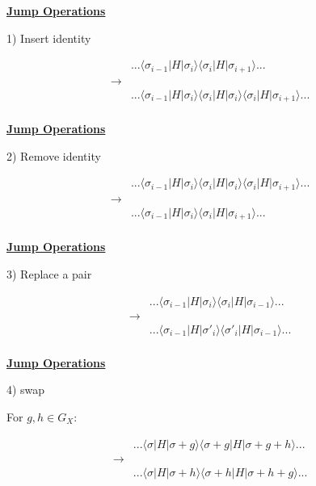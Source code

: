 \documentclass[11pt]{article}
\def\heading #1{\centerline{\underline{\bf\LARGE #1}}}
\def\vsp {\vspace*{0.5cm}}
\def\ket #1{|#1\rangle}
\def\bra #1{\langle #1|}
\begin{document}
\heading{Jump Operations}

\vsp
1) Insert identity

\begin{align*}
&... \bra{\sigma_{i-1}} H \ket{\sigma_i}\bra{\sigma_{i}} H \ket{\sigma_{i+1}}... \\
\longrightarrow &\\
&... \bra{\sigma_{i-1}} H \ket{\sigma_i}
    \bra{\sigma_{i}} H \ket{\sigma_{i}} 
    \bra{\sigma_{i}} H \ket{\sigma_{i+1}}... \\
\end{align*}


\newpage %

\heading{Jump Operations}

\vsp
2) Remove identity

\begin{align*}
&... \bra{\sigma_{i-1}} H \ket{\sigma_i}
    \bra{\sigma_{i}} H \ket{\sigma_{i}} 
    \bra{\sigma_{i}} H \ket{\sigma_{i+1}}... \\
\longrightarrow &\\
&... \bra{\sigma_{i-1}} H \ket{\sigma_i}\bra{\sigma_{i}} H \ket{\sigma_{i+1}}... \\
\end{align*}

\newpage %

\heading{Jump Operations}

\vsp
3) Replace a pair

\begin{align*}
&... \bra{\sigma_{i-1}} H \ket{\sigma_i}
    \bra{\sigma_{i}} H \ket{\sigma_{i-1}} ...\\
\longrightarrow &\\
&... \bra{\sigma_{i-1}} H \ket{\sigma'_i}
    \bra{\sigma'_{i}} H \ket{\sigma_{i-1}} ...\\
\end{align*}


\newpage %

\heading{Jump Operations}

\vsp
4) swap

\vsp
For $g, h \in G_X:$

\begin{align*}
&... \bra{\sigma} H \ket{\sigma + g}
    \bra{\sigma + g} H \ket{\sigma+g+h}... \\
\longrightarrow &\\
&... \bra{\sigma} H \ket{\sigma + h}
    \bra{\sigma + h} H \ket{\sigma+h+g}... \\
\end{align*}
\end{document}
